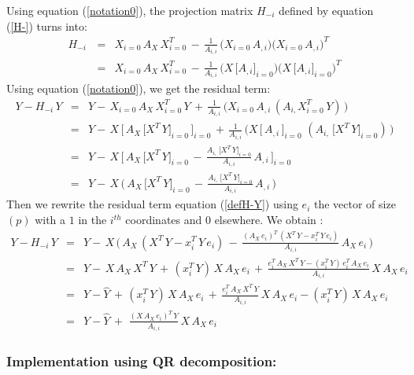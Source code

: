  Using equation (\ref{notation0}), the projection matrix $H_{-i}$ defined by equation (\ref{H-}) turns into:
 \begin{eqnarray}
H_{-i}\, & = & X_{i=0}\,A_X\,X_{i=0}^T \,-\,\frac {1}{A_{i,i}}\,  \big(X_{i=0}\,A_{,i}\big) \big(X_{i=0}\,A_{,i}\big)^T   \\
& = & X_{i=0}\,A_X\,X_{i=0}^T \,-\,\frac {1}{A_{i,i}}\,  \big(X\,\big[A_{,i}\big]_{i=0}  \big) \big(X\,\big[A_{,i}\big]_{i=0} \big)^T
\end{eqnarray}
 Using equation (\ref{notation0}), we get the residual term:
 \begin{eqnarray}
Y-H_{-i}\,Y & = &Y- \,X_{i=0}\,A_X\,X_{i=0}^T\,Y \,+\,\frac {1}{A_{i,i}}\,  \big(X_{i=0}\,A_{,i}\,(A_{i,} X_{i=0}^T\,Y)\,\big)   \\
 & = & Y-\,X\,\big[\,A_X\,\big[X^T\,Y\big]_{i=0}\,\big]_{i=0} \,+\,\frac {1}{A_{i,i}}\,  \big( X\,\big[\,A_{,i}\,\big]_{i=0}\,\,(A_{i,} \,\big[X^T\,Y\big]_{i=0})\,\big)   \\
 & = & Y-\,X\,\big[\,A_X\,\big[X^T\,Y\big]_{i=0}\, -\,\frac {A_{i,} \,\big[X^T\,Y\big]_{i=0}}{A_{i,i}}\,A_{,i}\,      \big]_{i=0} \\
\label{defH-Y}
 & = & Y- \,X\,\big(\,A_X\,\big[X^T\,Y\big]_{i=0}\, -\,\frac {A_{i,} \,\big[X^T\,Y\big]_{i=0}}{A_{i,i}}\,A_{,i}\,\big)
\end{eqnarray}
Then we rewrite the residual term  equation (\ref{defH-Y}) using $e_i$ the vector of size $(p)$ with a $1$ in the $i^{th}$ coordinates and $0$ elsewhere.
We obtain :
 \begin{eqnarray}
Y-H_{-i}\,Y & = &Y- \,X\,\big(\,A_X\,(X^T\,Y-x_i^T\,Y\,e_i)\, -\,\frac {(A_X\,e_i)^T \,(X^T\,Y-x_i^T\,Y\,e_i)}{A_{i,i}}\,A_X\,e_i\,\big)  \\
 & = &  Y- \,X\, A_X\,X^T\,Y \,+\, (x_i^T\,Y)\,X\, A_X\,e_i \,+\,\frac { e_i^T\,A_X\,X^T\,Y-(x_i^T\,Y) \,e_i^T\,A_X\,e_i}{A_{i,i}} \,X\, A_X\,e_i  \\
 & = & Y- \hat{Y}  \,+\, (x_i^T\,Y)\,X\, A_X\,e_i \,+\,\frac { e_i^T\,A_X\,X^T\,Y}{A_{i,i}} \,X\, A_X\,e_i -(x_i^T\,Y)\,X\, A_X\,e_i \\
\label{defH-Y2}
 & = & Y- \hat{Y} \,+\,\,\frac { (X\, A_X\,e_i)^T\,Y}{A_{i,i}} \,X\, A_X\,e_i
\end{eqnarray}

\subsubsection{Implementation using QR decomposition:}

